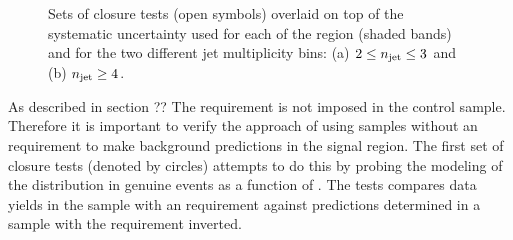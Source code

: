 \begin{figure}[h!]
  \begin{center}
     \\
     \\
    \caption{Sets of closure tests (open symbols) overlaid on top of
      the systematic uncertainty used for each of the \scalht
      region (shaded bands) and for the two different jet
      multiplicity bins: (a) $2 \leq n_{\text{jet}} \leq 3$ and (b) $n_{\text{jet}} \geq
      4$.  }
    \label{fig:closure}
  \end{center} 
\end{figure}

As described in section ?? The \alphat requirement is not imposed 
in the \mj control sample. Therefore it is important to verify the 
approach of using \mj samples without an \alphat requirement to 
make background predictions in the signal region.  The first set of
closure tests (denoted by circles) attempts to do this by probing
the modeling of the \alphat distribution in genuine \met events as a
function of \scalht.  The tests compares data yields in the \mj
sample with an \alphat requirement against predictions determined in a
\mj sample with the \alphat requirement inverted. 

